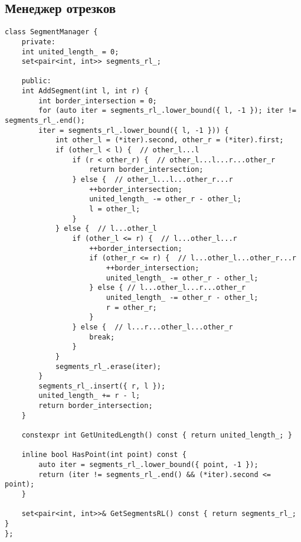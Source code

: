 \documentclass[14pt,fleqn]{article}
\begin{document}
\subsection{Менеджер отрезков}
\begin{Verbatim}[tabsize=4]
class SegmentManager {
	private:
	int united_length_ = 0;
	set<pair<int, int>> segments_rl_;
	
	public:
	int AddSegment(int l, int r) {
		int border_intersection = 0;
		for (auto iter = segments_rl_.lower_bound({ l, -1 }); iter != segments_rl_.end();
		iter = segments_rl_.lower_bound({ l, -1 })) {
			int other_l = (*iter).second, other_r = (*iter).first;
			if (other_l < l) {  // other_l...l
				if (r < other_r) {  // other_l...l...r...other_r
					return border_intersection;
				} else {  // other_l...l...other_r...r
					++border_intersection;
					united_length_ -= other_r - other_l;
					l = other_l;
				}
			} else {  // l...other_l
				if (other_l <= r) {  // l...other_l...r
					++border_intersection;
					if (other_r <= r) {  // l...other_l...other_r...r
						++border_intersection;
						united_length_ -= other_r - other_l;
					} else { // l...other_l...r...other_r
						united_length_ -= other_r - other_l;
						r = other_r;
					}
				} else {  // l...r...other_l...other_r
					break;
				}
			}
			segments_rl_.erase(iter);
		}
		segments_rl_.insert({ r, l });
		united_length_ += r - l;
		return border_intersection;
	}
	
	constexpr int GetUnitedLength() const { return united_length_; }
	
	inline bool HasPoint(int point) const {
		auto iter = segments_rl_.lower_bound({ point, -1 });
		return (iter != segments_rl_.end() && (*iter).second <= point);
	}
	
	set<pair<int, int>>& GetSegmentsRL() const { return segments_rl_; }
};
\end{Verbatim}
\end{document}
